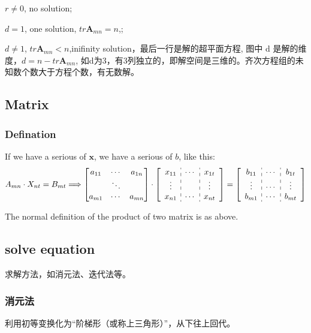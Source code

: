 \documentclass[UTF8]{../09-Mathematics}
\begin{document}
$r \neq 0$, no solution;

$d = 1$, one solution, $tr \boldsymbol A_{mn} = n$,;

$d \neq 1$, $tr \boldsymbol A_{mn} < n$,inifinity solution，最后一行是解的超平面方程, 图中 d 是解的维度，$d =  n -tr \boldsymbol A_{mn}$, 如d为3，有3列独立的，即解空间是三维的。齐次方程组的未知数个数大于方程个数，有无数解。


\subsection{Matrix}


\subsubsection{Defination}

If we have a serious of $\boldsymbol x$, we have a serious of $b$, like this:
\begin{equation}
  A_{mn} \cdot X_{nt} = B_{mt}
  \Longrightarrow
  \begin{bmatrix}
     a_{11} & \cdots & a_{1n}\\
     & \ddots & \\
     a_{m1} & \cdots & a_{mn} \\
  \end{bmatrix}
  \cdot
  \left[
    \begin{array}{c:c:c}
      x_{11} & \cdots & x_{1t}\\
     \vdots&  & \vdots \\
     x_{n1} & \cdots & x_{nt} \\
    \end{array}
 \right] 
  =
 \left[
    \begin{array}{c:c:c}
      b_{11} & \cdots & b_{1t}\\
      \vdots& \cdots & \vdots \\
      b_{m1} & \cdots & b_{mt} \\
    \end{array}
 \right] 
\end{equation}

The normal definition of the product of two matrix is as above. 

\subsection{solve equation}
求解方法，如消元法、迭代法等。

\subsubsection{消元法}
利用初等变换化为“阶梯形（或称上三角形）”，从下往上回代。
\end{document}
